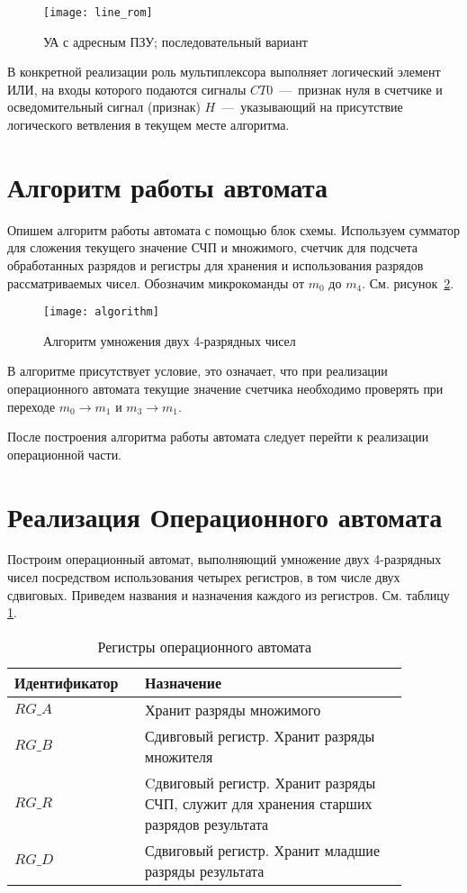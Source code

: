 \documentclass[a4paper,14pt]{extarticle}
\begin{document}
\begin{figure}[h!]
	\begin{center}
		\texttt{[image: line\_rom]}
		\caption{УА с адресным ПЗУ; последовательный вариант}
		\label{img:scheme}
	\end{center}	
\end{figure}

В конкретной реализации роль мультиплексора выполняет логический элемент ИЛИ, на входы которого подаются сигналы $CT0$~---~признак нуля в счетчике и осведомительный сигнал (признак) $H$~---~указывающий на присутствие логического ветвления в текущем месте алгоритма.
\newpage
\section{Алгоритм работы автомата}
Опишем алгоритм работы автомата с помощью блок схемы. Используем сумматор для сложения текущего значение СЧП и множимого, счетчик для подсчета обработанных разрядов и регистры для хранения и использования разрядов рассматриваемых чисел. Обозначим микрокоманды от $m_0$ до $m_4$. См. рисунок~\ref{img:algorithm}.\vspace{2ex}

\begin{figure}[h!]
	\centering
	\texttt{[image: algorithm]}
	\caption {Алгоритм умножения двух 4-разрядных чисел}
	\label{img:algorithm}
\end{figure}

В алгоритме присутствует условие, это означает, что при реализации операционного автомата текущие значение счетчика необходимо проверять при переходе $m_0 \to m_1$ и $m_3 \to m_1$.

После построения алгоритма работы автомата следует перейти к реализации операционной части.

\section {Реализация Операционного автомата}
Построим операционный автомат, выполняющий умножение двух 4-разрядных чисел посредством использования четырех регистров, в том числе двух сдвиговых. Приведем названия и назначения каждого из регистров. См. таблицу \ref{tab:regs}.
\begin{table}[h!]
	\centering
		\begin{tabular}{|p{0.27\linewidth}|p{0.6\linewidth}|}
			\hline
			\textbf{Идентификатор} & \textbf{Назначение} \\ \hline
			$RG\_A$ & Хранит разряды множимого \\ \hline
			$RG\_B$ & Сдивговый регистр. Хранит разряды множителя \\ \hline
			$RG\_R$ & Cдвиговый регистр. Хранит разряды СЧП, служит для хранения старших разрядов результата \\ \hline
			$RG\_D$ & Сдвиговый регистр. Хранит младшие разряды результата \\ \hline
		\end{tabular}
		\caption{Регистры операционного автомата}
		\label{tab:regs}
\end{table}
\end{document}
